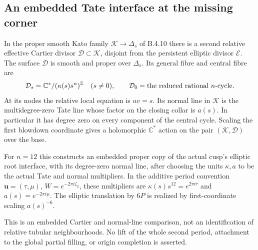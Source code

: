 \subsection{An embedded Tate interface at the missing corner}

\begin{proposition}\label{push:src:B.4.20}
\label{push:B420}
In the proper smooth Kato family $\mathcal K\to\Delta_s$
of B.4.10 there is a second relative effective Cartier
divisor $\mathcal D\subset\mathcal K$, disjoint from
the persistent elliptic divisor $\mathcal E$.
The surface $\mathcal D$ is smooth and proper over
$\Delta_s$. Its general fibre and central fibre are
\[
 \mathcal D_s=\mathbb C^*/(\kappa(s)s^n)^\mathbb Z
 \quad(s\ne0),\qquad
 \mathcal D_0=\hbox{the reduced rational }n\hbox{-cycle}.
\]
At its nodes the relative local equation is $uv=s$.
Its normal line in $\mathcal K$ is the multidegree-zero
Tate line whose factor on the closing collar is $a(s)$.
In particular it has degree zero on every component
of the central cycle. Scaling the first blowdown
coordinate gives a holomorphic $\mathbb C^*$ action
on the pair $(\mathcal K,\mathcal D)$ over the base.

For $n=12$ this constructs an embedded proper copy of
the actual cusp's elliptic root interface, with its
degree-zero normal line, after choosing the units
$\kappa,a$ to be the actual Tate and normal multipliers.
In the additive period convention $\mathbf u=(\tau,\mu)$,
$W=e^{-2\pi i\zeta_2}$, these multipliers are
$\kappa(s)s^{12}=e^{2\pi i\tau}$ and
$a(s)=e^{-2\pi i\mu}$. The elliptic translation by
$6P$ is realized by first-coordinate scaling
$a(s)^{-6}$.

This is an embedded Cartier and normal-line comparison,
not an identification of relative tubular neighbourhoods.
No lift of the whole second period, attachment to the
global partial filling, or origin completion is asserted.
\end{proposition}

